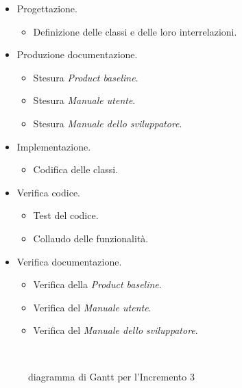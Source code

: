 \documentclass[../piano-di-progetto.tex]{subfiles}
\begin{document}
\begin{itemize}
  \item Progettazione.
  \begin{itemize}
    \item Definizione delle classi e delle loro interrelazioni.
  \end{itemize}
  \item Produzione documentazione.
  \begin{itemize}
    \item Stesura \textit{Product baseline}.
    \item Stesura \textit{Manuale utente}.
    \item Stesura \textit{Manuale dello sviluppatore}.
  \end{itemize}
  \item Implementazione.
  \begin{itemize}
    \item Codifica delle classi.
  \end{itemize}
  \item Verifica codice.
  \begin{itemize}
    \item Test del codice.
    \item Collaudo delle funzionalità.
  \end{itemize}
  \item Verifica documentazione.
  \begin{itemize}
    \item Verifica della \textit{Product baseline}.
    \item Verifica del \textit{Manuale utente}.
    \item Verifica del \textit{Manuale dello sviluppatore}.
  \end{itemize}
\end{itemize}
\begin{figure}[H]
  \centering
  
  \caption{diagramma di Gantt per l'Incremento 3}%
~~\label{fig:gantt_incremento_3}
\end{figure}
\end{document}
